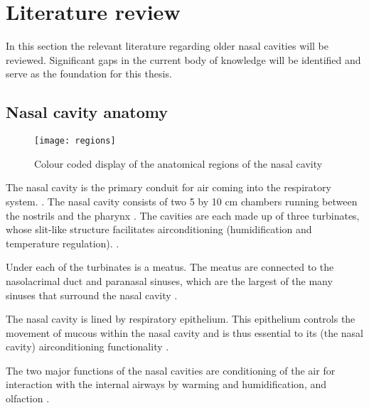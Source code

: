 \section{Literature review}
In this section the relevant literature regarding older nasal cavities will be reviewed. Significant gaps in the current body of knowledge will be identified and serve as the foundation for this thesis.

\subsection{Nasal cavity anatomy}


\begin{figure}
\centering
\texttt{[image: regions]}
\caption{Colour coded display of the anatomical regions of the nasal cavity} 
\label{fig:regions1}
\end{figure} 


The nasal cavity is the primary conduit for air coming into the respiratory system. \cite{Elad2008}. The nasal cavity consists of two 5 by 10 cm chambers running between the nostrils and the pharynx \cite{Mygind1998}. The cavities are each made up of three turbinates, whose slit-like structure facilitates airconditioning (humidification and temperature regulation). \cite{Mygind1998}. 

Under each of the turbinates is a meatus. The meatus are connected to the nasolacrimal duct and paranasal sinuses, which are the largest of the many sinuses that surround the nasal cavity \cite{Mygind1998}. 

The nasal cavity is lined by respiratory epithelium. This epithelium controls the movement of mucous within the nasal cavity and is thus essential to its (the nasal cavity) airconditioning functionality \cite{Mygind1998}.

The two major functions of the nasal cavities are conditioning of the air for interaction with the internal airways by warming and humidification, and olfaction \cite{Doorly2008, Elad2008, Mygind1998, Berglund1982}.

